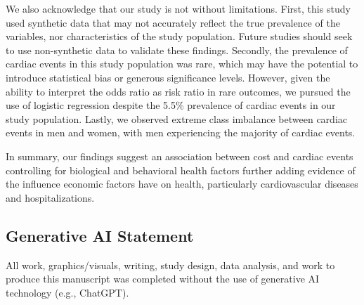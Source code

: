 \documentclass[
  letterpaper,
  DIV=11,
  numbers=noendperiod]{scrartcl}
\begin{document}
We also acknowledge that our study is not without limitations. First,
this study used synthetic data that may not accurately reflect the true
prevalence of the variables, nor characteristics of the study
population. Future studies should seek to use non-synthetic data to
validate these findings. Secondly, the prevalence of cardiac events in
this study population was rare, which may have the potential to
introduce statistical bias or generous significance levels. However,
given the ability to interpret the odds ratio as risk ratio in rare
outcomes, we pursued the use of logistic regression despite the 5.5\%
prevalence of cardiac events in our study population. Lastly, we
observed extreme class imbalance between cardiac events in men and
women, with men experiencing the majority of cardiac events.

In summary, our findings suggest an association between cost and cardiac
events controlling for biological and behavioral health factors further
adding evidence of the influence economic factors have on health,
particularly cardiovascular diseases and hospitalizations.

\subsection{Generative AI Statement}\label{generative-ai-statement}

All work, graphics/visuals, writing, study design, data analysis, and
work to produce this manuscript was completed without the use of
generative AI technology (e.g., ChatGPT).
\end{document}
